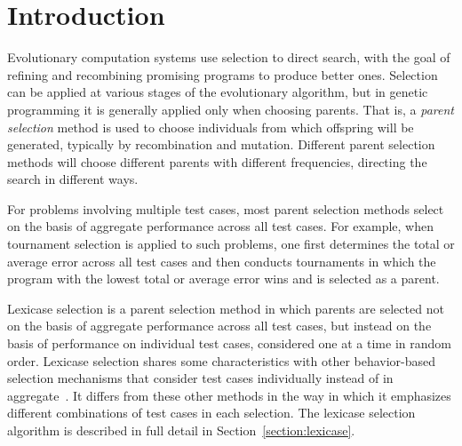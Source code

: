 \documentclass{sig-alternate}
\begin{document}

%
%

%
%
\printccsdesc



\section{Introduction}
\label{section:introduction}

Evolutionary computation systems use selection to direct search, with the goal of refining and recombining promising programs to produce better ones. Selection can be applied at various stages of the evolutionary algorithm, but in genetic programming it is generally applied only when choosing parents. That is, a \emph{parent selection} method is used to choose individuals from which offspring will be generated, typically by recombination and mutation. Different parent selection methods will choose different parents with different frequencies, directing the search in different ways.

For problems involving multiple test cases, most parent selection methods select on the basis of aggregate performance across all test cases. For example, when tournament selection is applied to such problems, one first determines the total or average error across all test cases and then conducts tournaments in which the program with the lowest total or average error wins and is selected as a parent.

Lexicase selection is a parent selection method in which parents are selected not on the basis of aggregate performance across all test cases, but instead on the basis of performance on individual test cases, considered one at a time in random order. Lexicase selection shares some characteristics with other behavior-based selection mechanisms that consider test cases individually instead of in aggregate~\cite{Krawiec:2015:GPTP, Krawiec:2015:GECCO:smgpWorkshop}. It differs from these other methods in the way in which it emphasizes different combinations of test cases in each selection. The lexicase selection algorithm is described in full detail in Section~\ref{section:lexicase}.
\end{document}
